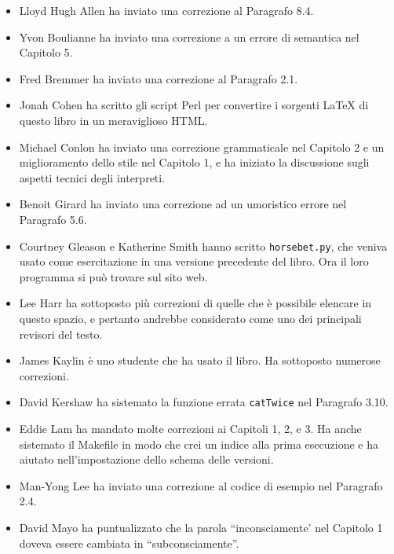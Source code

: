 \documentclass[10pt]{book}
\begin{document}
\begin{itemize}

\small
\item Lloyd Hugh Allen ha inviato una correzione al Paragrafo 8.4.

\item Yvon Boulianne ha inviato una correzione a un errore di semantica nel Capitolo 5.

\item Fred Bremmer ha inviato una correzione al Paragrafo 2.1.

\item Jonah Cohen ha scritto gli script Perl per convertire i sorgenti
LaTeX di questo libro in un meraviglioso HTML.

\item Michael Conlon ha inviato una correzione grammaticale nel Capitolo 2
e un miglioramento dello stile nel Capitolo 1, e ha iniziato la discussione sugli aspetti tecnici degli interpreti.

\item Benoit Girard ha inviato una correzione ad un umoristico errore nel Paragrafo 5.6.

\item Courtney Gleason e Katherine Smith hanno scritto {\tt horsebet.py},
che veniva usato come esercitazione in una versione precedente del libro. Ora il loro programma si può trovare sul sito web.

\item Lee Harr ha sottoposto più correzioni di quelle che è possibile elencare in questo spazio, e pertanto andrebbe considerato come uno dei principali revisori del testo.

\item James Kaylin è uno studente che ha usato il libro. Ha sottoposto numerose correzioni.

\item David Kershaw ha sistemato la funzione errata {\tt catTwice} nel Paragrafo
3.10.

\item Eddie Lam ha mandato molte correzioni ai Capitoli 1, 2, e 3.
Ha anche sistemato il Makefile in modo che crei un indice alla prima esecuzione e ha aiutato nell'impostazione dello schema delle versioni.  

\item Man-Yong Lee ha inviato una correzione al codice di esempio nel Paragrafo 2.4.  

\item David Mayo ha puntualizzato che la parola ``inconsciamente' nel Capitolo 1 doveva essere cambiata in ``subconsciamente''.


\end{itemize}
\end{document}
